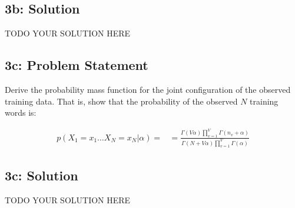 \documentclass[12pt]{article}
\newcommand{\officialdirections}[1]{{\color{blue} #1}}
\begin{document}
\subsection{3b: Solution}

TODO YOUR SOLUTION HERE

\newpage
\officialdirections{
\subsection*{3c: Problem Statement}


Derive the probability mass function for the joint configuration of the observed training data. 
That is, show that the probability of the observed $N$ training words is:

\begin{align}
p( X_1 = x_1 \ldots X_N = x_N | \alpha) = 
	&= \frac
	{ \Gamma(V \alpha)      \prod_{v=1}^V \Gamma( n_v + \alpha ) }
	{ \Gamma(N + V \alpha ) \prod_{v=1}^V \Gamma(\alpha)         }
\end{align}
}


\subsection{3c: Solution}


TODO YOUR SOLUTION HERE
\end{document}
